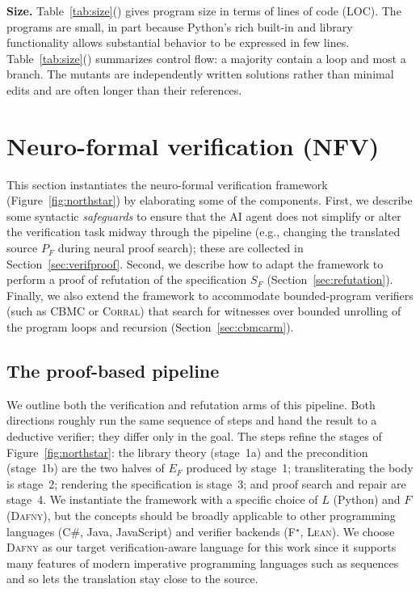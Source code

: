 \documentclass[11pt,letterpaper]{article}
\newcommand{\daf}{\textsc{Dafny}}
\newcommand{\lean}{\textsc{Lean}}
\newcommand{\fstar}{\textsc{F}$^{\star}$}
\begin{document}
\textbf{Size.} Table~\ref{tab:size}() gives program size in
terms of lines of code (LOC). The programs are small, in part because Python's
rich built-in and library functionality allows substantial behavior to be
expressed in few lines. Table~\ref{tab:size}()
summarizes control flow: a majority contain a loop and most a branch.
The mutants are independently written solutions
rather than minimal edits and are often longer than their references. 



\section{Neuro-formal verification (NFV)}
\label{sec:nfv}

This section instantiates the neuro-formal verification framework (Figure~\ref{fig:northstar}) 
by elaborating some of the components. 
First, we describe some syntactic \emph{safeguards} to ensure that the AI agent does not simplify or alter the 
verification task midway through the pipeline (e.g., changing the translated source $P_F$ during neural proof search); these are collected in Section~\ref{sec:verifproof}.
Second, we describe how to adapt the framework to perform a proof of refutation of the specification $S_F$ (Section~\ref{sec:refutation}).
Finally, we also extend the framework to accommodate bounded-program verifiers (such as \textsc{CBMC} or \textsc{Corral}) that search 
for witnesses over bounded unrolling of the program loops and recursion (Section~\ref{sec:cbmcarm}). 

\subsection{The proof-based pipeline}
\label{sec:proofbased}

We outline both the verification and refutation arms of this pipeline. 
Both directions roughly run the same sequence of steps and hand the result to a deductive
verifier; they differ only in the goal. The steps refine the stages of
Figure~\ref{fig:northstar}: the library theory (stage~1a) and the precondition (stage~1b) are
the two halves of $E_F$ produced by stage~1; transliterating the body is
stage~2; rendering the specification is stage~3; and proof search and repair are
stage~4. 
We instantiate the framework with a specific choice of $L$ (Python) and $F$ (\daf{}), but the concepts should 
be broadly applicable to other programming languages (C\#, Java, JavaScript) and verifier backends (\fstar{}, \lean{}).
We choose \daf{} as our target verification-aware language for this work since it supports many 
features of modern imperative programming languages such as sequences and so lets the 
translation stay close to the source.
\end{document}
